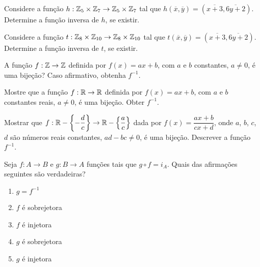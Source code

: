 \documentclass[12pt]{exam}
\begin{document}
    \vspace{.3cm}

    \questao{} Considere a função $h : \mathbb{Z}_5 \times \mathbb{Z}_7 \to \mathbb{Z}_5 \times \mathbb{Z}_7$ tal que $h(\overline{x},\overline{y}) = (\overline{x + 3}, \overline{6y + 2})$. Determine a função inversa de $h$, se existir.

    \vspace{.3cm}

    \questao{} Considere a função $t : \mathbb{Z}_8 \times \mathbb{Z}_{10} \to \mathbb{Z}_8 \times \mathbb{Z}_{10}$ tal que $t(\overline{x},\overline{y}) = (\overline{x + 3}, \overline{6y + 2})$. Determine a função inversa de $t$, se existir.

    \vspace{.3cm}

    \questao{} A função $f : \mathbb{Z} \to \mathbb{Z}$ definida por $f(x) = ax + b$, com $a$ e $b$ constantes, $a \ne 0$, é uma bijeção? Caso afirmativo, obtenha $f^{-1}$.

    \vspace{.3cm}


    \questao{} Mostre que a função $f : \mathbb{R} \to \mathbb{R}$ definida por $f(x) = ax + b$, com $a$ e $b$ constantes reais, $a \ne 0$, é uma bijeção. Obter $f^{-1}$.

    \vspace{.3cm}

    \questao{} Mostrar que $f : \mathbb{R} - \left\{-\dfrac{d}{c}\right\} \to \mathbb{R}  - \left\{\dfrac{a}{c}\right\}$ dada por $f(x) =  \dfrac{ax + b}{cx + d}$, onde $a$, $b$, $c$, $d$ são n{\'u}meros reais constantes, $ad - bc \ne 0$, é uma bijeção. Descrever a função $f^{-1}$.

    \vspace{.3cm}

    \questao{} Seja $f : A \to B$ e $g : B \to A$ funções tais que $g \circ f = i_A$. Quais das afirmações seguintes são verdadeiras?
    \begin{enumerate}[label={\alph*})]
        \item $g = f^{-1}$

        \item $f$ é sobrejetora

        \item $f$ é injetora

        \item $g$ é sobrejetora

        \item $g$ é injetora
    \end{enumerate}
\end{document}
